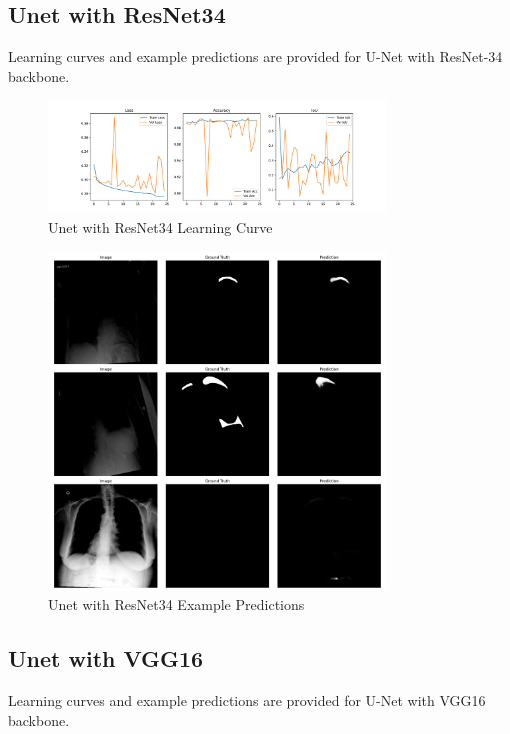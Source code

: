 \documentclass{article}
\begin{document}
\subsection*{Unet with ResNet34}
Learning curves and example predictions are provided for U-Net with ResNet-34 backbone.

\begin{figure}[H]
    \centering
    \includegraphics[width=0.8\textwidth]{plots/ures.pdf}
    \caption{Unet with ResNet34 Learning Curve}
    \label{fig:unet_res34}
\end{figure}

\begin{figure}[H]
    \centering
    \includegraphics[width=0.8\textwidth]{plots/uresp.pdf}
    \caption{Unet with ResNet34 Example Predictions}
    \label{fig:unet_res34_p}
\end{figure}

\subsection*{Unet with VGG16}
Learning curves and example predictions are provided for U-Net with VGG16 backbone.
\end{document}
